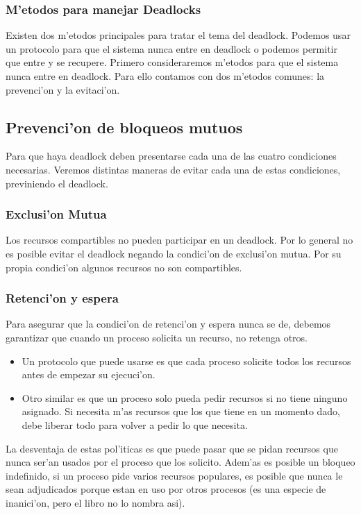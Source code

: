 \subsubsection{M'etodos para manejar Deadlocks}
Existen dos m'etodos principales para tratar el tema del deadlock. Podemos usar un protocolo para que el sistema nunca entre en deadlock o podemos permitir que entre y se recupere.
Primero consideraremos m'etodos para que el sistema nunca entre en deadlock. Para ello contamos con dos m'etodos comunes: la prevenci'on y la evitaci'on.

\subsection{Prevenci'on de bloqueos mutuos}
Para que haya deadlock deben presentarse cada una de las cuatro condiciones necesarias. Veremos distintas maneras de evitar cada una de estas condiciones, previniendo el deadlock.

\subsubsection{Exclusi'on Mutua}
Los recursos compartibles no pueden participar en un deadlock.
Por lo general no es posible evitar el deadlock negando la condici'on de exclusi'on mutua. Por su propia condici'on algunos recursos no son compartibles.

\subsubsection{Retenci'on y espera}
Para asegurar que la condici'on de retenci'on y espera nunca se de, debemos garantizar que cuando un proceso solicita un recurso, no retenga otros.
\begin{itemize}
 \item Un protocolo que puede usarse es que cada proceso solicite todos los recursos antes de empezar su ejecuci'on.
 \item Otro similar es que un proceso solo pueda pedir recursos si no tiene ninguno asignado. Si necesita m'as recursos que los que tiene en un momento dado, debe liberar todo para volver a pedir lo que necesita.
\end{itemize} 
La desventaja de estas pol'iticas es que puede pasar que se pidan recursos que nunca ser'an usados por el proceso que los solicito.
Adem'as es posible un bloqueo indefinido, si un proceso pide varios recursos populares, es posible que nunca le sean adjudicados porque estan en uso por otros procesos (es una especie de inanici'on, pero el libro no lo nombra asi).

